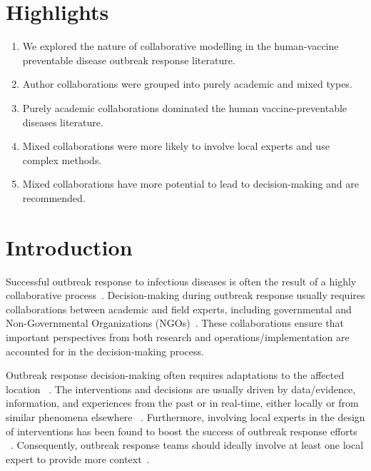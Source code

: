 \documentclass[10pt,letterpaper]{article}
\begin{document}
\section*{Highlights}
\begin{enumerate}
	\item We explored the nature of collaborative modelling in the human-vaccine preventable disease outbreak response literature.
	\item Author collaborations were grouped into purely academic and mixed types.
	\item Purely academic collaborations dominated the human vaccine-preventable diseases literature.
	\item Mixed collaborations were more likely to involve local experts and use complex methods.
	\item Mixed collaborations have more potential to lead to decision-making and are recommended.
\end{enumerate}


\linenumbers

\section*{Introduction}
Successful outbreak response to infectious diseases is often the result of a highly collaborative process~\cite{Sigfrid2020}. Decision-making during outbreak response usually requires collaborations between academic and field experts, including governmental and Non-Governmental Organizations (NGOs)~\cite{Kretzschmar2020,Kerkhove2012,Okiror2021,Whitty2014,Sigfrid2020}. These collaborations ensure that important perspectives from both research and operations/implementation are accounted for in the decision-making process. 

Outbreak response decision-making often requires adaptations to the affected location ~\cite{Whitty2014,Heesterbeek2015,Sigfrid2020}. The interventions and decisions are usually driven by data/evidence, information, and experiences from the past or in real-time, either locally or from similar phenomena elsewhere ~\cite{Abramowitz2015,Kerkhove2012}. Furthermore, involving local experts in the design of interventions has been found to boost the success of outbreak response efforts ~\cite{Sigfrid2020}. Consequently, outbreak response teams should ideally involve at least one local expert to provide more context~\cite{Sigfrid2020}.  
\end{document}
